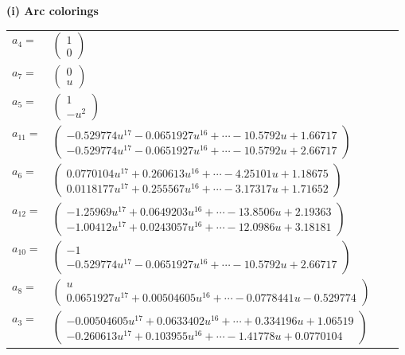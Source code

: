 \documentclass[1p]{elsarticle_modified}
\theoremstyle{definition}
\begin{document}
\flushleft \textbf{(i) Arc colorings}\\
\begin{tabular}{m{7pt} m{180pt} m{7pt} m{180pt} }
\flushright $a_{4}=$&$\begin{pmatrix}1\\0\end{pmatrix}$ \\
\flushright $a_{7}=$&$\begin{pmatrix}0\\u\end{pmatrix}$ \\
\flushright $a_{5}=$&$\begin{pmatrix}1\\- u^2\end{pmatrix}$ \\
\flushright $a_{11}=$&$\begin{pmatrix}-0.529774 u^{17}-0.0651927 u^{16}+\cdots-10.5792 u+1.66717\\-0.529774 u^{17}-0.0651927 u^{16}+\cdots-10.5792 u+2.66717\end{pmatrix}$ \\
\flushright $a_{6}=$&$\begin{pmatrix}0.0770104 u^{17}+0.260613 u^{16}+\cdots-4.25101 u+1.18675\\0.0118177 u^{17}+0.255567 u^{16}+\cdots-3.17317 u+1.71652\end{pmatrix}$ \\
\flushright $a_{12}=$&$\begin{pmatrix}-1.25969 u^{17}+0.0649203 u^{16}+\cdots-13.8506 u+2.19363\\-1.00412 u^{17}+0.0243057 u^{16}+\cdots-12.0986 u+3.18181\end{pmatrix}$ \\
\flushright $a_{10}=$&$\begin{pmatrix}-1\\-0.529774 u^{17}-0.0651927 u^{16}+\cdots-10.5792 u+2.66717\end{pmatrix}$ \\
\flushright $a_{8}=$&$\begin{pmatrix}u\\0.0651927 u^{17}+0.00504605 u^{16}+\cdots-0.0778441 u-0.529774\end{pmatrix}$ \\
\flushright $a_{3}=$&$\begin{pmatrix}-0.00504605 u^{17}+0.0633402 u^{16}+\cdots+0.334196 u+1.06519\\-0.260613 u^{17}+0.103955 u^{16}+\cdots-1.41778 u+0.0770104\end{pmatrix}$ \\

\end{tabular}
\end{document}
